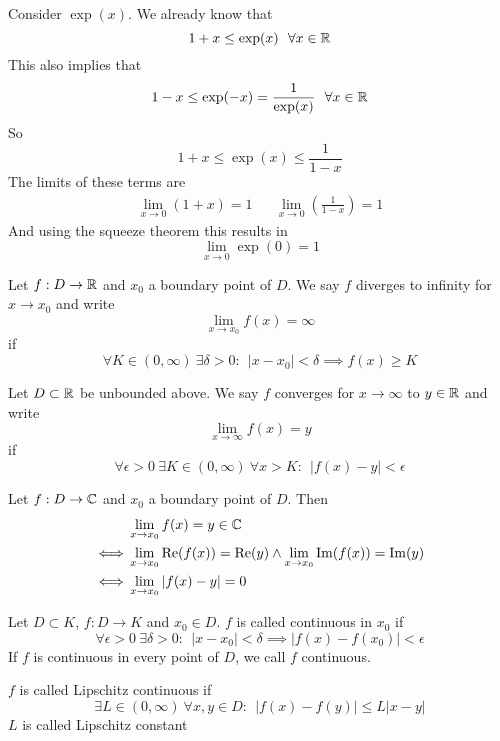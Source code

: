 \documentclass[../script.tex]{subfiles}
\begin{document}
\begin{eg}
    Consider $\exp(x)$. We already know that 
    \[
        1 + x \le \exp(x) ~~\forall x \in \mathbb{R}
    \]
    This also implies that 
    \[
        1 - x \le \exp(-x) = \frac{1}{\exp(x)} ~~\forall x \in \mathbb{R}
    \]
    So 
    \[
        1 + x \le \exp(x) \le \frac{1}{1 - x}
    \]
    The limits of these terms are 
    \begin{align*}
        \lim_{x \rightarrow 0} (1+x) = 1 && \lim_{x \rightarrow 0} \left(\frac{1}{1-x}\right) = 1
    \end{align*}
    And using the squeeze theorem this results in 
    \[
        \lim_{x \rightarrow 0} \exp(0) = 1
    \]
\end{eg}

\begin{defi}
    Let $f: D \rightarrow \mathbb{R}$ and $x_0$ a boundary point of $D$. We say $f$ diverges to infinity for $x \rightarrow x_0$ and write 
    \[
        \lim_{x \rightarrow x_0} f(x) = \infty
    \]
    if 
    \[
        \forall K \in (0, \infty) ~\exists \delta > 0: ~~|x - x_0| < \delta \implies f(x) \ge K
    \]
\end{defi}

\begin{defi}
    Let $D \subset \mathbb{R}$ be unbounded above. We say $f$ converges for $x \rightarrow \infty$ to $y \in \mathbb{R}$ and write 
    \[
        \lim_{x \rightarrow \infty} f(x) = y
    \]
    if 
    \[
        \forall \epsilon > 0 ~\exists K \in (0, \infty) ~\forall x > K: ~~|f(x) - y| < \epsilon
    \]
\end{defi}

\begin{rem}
    Let $f: D \rightarrow \mathbb{C}$ and $x_0$ a boundary point of $D$. Then 
    \begin{align*}
        &\lim_{x \rightarrow x_0} f(x) = y \in \mathbb{C} \\
        \iff & \lim_{x \rightarrow x_0} \Re(f(x)) = \Re(y) \wedge \lim_{x \rightarrow x_0} \Im(f(x)) = \Im(y) \\
        \iff & \lim_{x \rightarrow x_0} |f(x) - y| = 0
    \end{align*}
\end{rem}

\begin{defi}
    Let $D \subset K$, $f:D \rightarrow K$ and $x_0 \in D$. $f$ is called continuous in $x_0$ if 
    \[
        \forall \epsilon > 0 ~\exists \delta > 0: ~~|x - x_0| < \delta \implies |f(x) - f(x_0)| < \epsilon
    \]
    If $f$ is continuous in every point of $D$, we call $f$ continuous.

    $f$ is called Lipschitz 
    continuous if 
    \[
        \exists L \in (0, \infty) ~\forall x, y \in D: ~~|f(x) - f(y)| \le L|x - y|
    \]
    $L$ is called Lipschitz constant
\end{defi}
\end{document}
